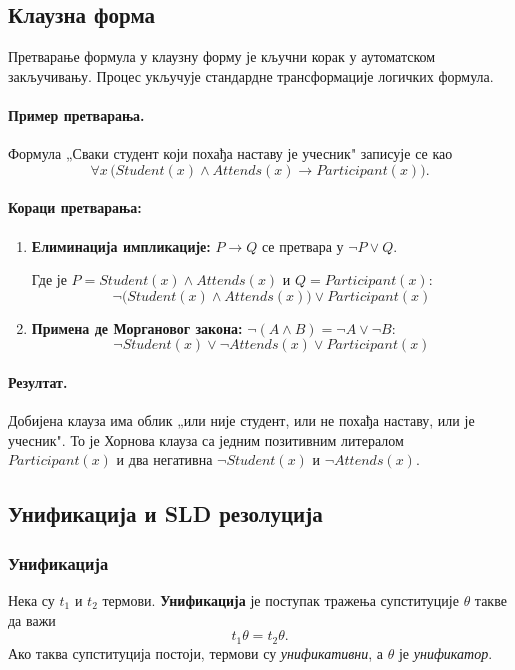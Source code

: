 \subsection{Клаузна форма}

Претварање формула у клаузну форму је кључни корак у аутоматском закључивању. Процес укључује стандардне трансформације логичких формула.

\paragraph{Пример претварања.}
Формула „Сваки студент који похађа наставу је учесник" записује се као
\[
\forall x\,\big(Student(x) \land Attends(x) \rightarrow Participant(x)\big).
\]

\paragraph{Кораци претварања:}
\begin{enumerate}
  \item \textbf{Елиминација импликације:} $P \rightarrow Q$ се претвара у $\neg P \lor Q$. 
  
  Где је $P = Student(x) \land Attends(x)$ и $Q = Participant(x)$:
  \[
  \neg\big(Student(x) \land Attends(x)\big) \lor Participant(x)
  \]
  
  \item \textbf{Примена де Моргановог закона:} $\neg(A \land B) = \neg A \lor \neg B$:
  \[
  \neg Student(x) \lor \neg Attends(x) \lor Participant(x)
  \]
\end{enumerate}

\paragraph{Резултат.}
Добијена клауза има облик „или није студент, или не похађа наставу, или је учесник". То је Хорнова клауза са једним позитивним литералом $Participant(x)$ и два негативна $\neg Student(x)$ и $\neg Attends(x)$.

\subsection{Унификација и SLD резолуција}

\subsubsection{Унификација}
Нека су $t_1$ и $t_2$ термови. \textbf{Унификација} је поступак тражења супституције $\theta$ такве да важи
\[
t_1 \theta = t_2 \theta.
\]
Ако таква супституција постоји, термови су \emph{унификативни}, а $\theta$ је \emph{унификатор}.

